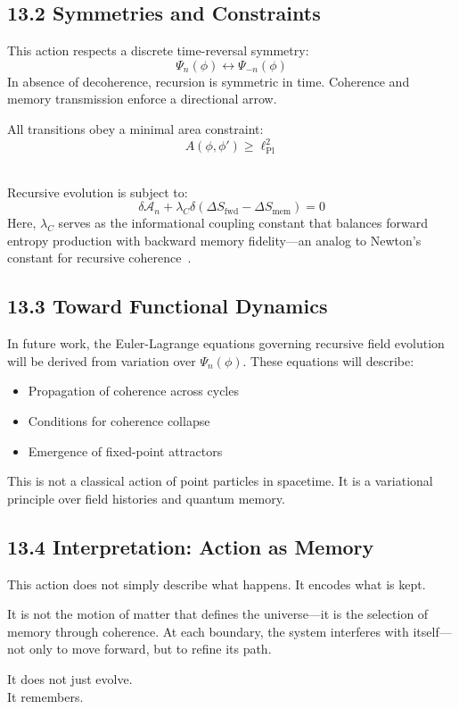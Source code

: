 \subsection*{13.2 Symmetries and Constraints}

This action respects a discrete time-reversal symmetry:
\[
\Psi_n(\phi) \leftrightarrow \Psi_{-n}(\phi)
\]
In absence of decoherence, recursion is symmetric in time. Coherence and memory transmission enforce a directional arrow.

All transitions obey a minimal area constraint:
\[
A(\phi, \phi') \geq \ell_{\text{Pl}}^2
\]
~\cite{bojowald2001absence, rovelli1995discreteness}

Recursive evolution is subject to:
\[
\delta \mathcal{A}_n + \lambda_C \delta(\Delta S_{\text{fwd}} - \Delta S_{\text{mem}}) = 0
\]
Here, \( \lambda_C \) serves as the informational coupling constant that balances forward entropy production with backward memory fidelity—an analog to Newton's constant for recursive coherence~\cite{gellmann1994complex}.

\subsection*{13.3 Toward Functional Dynamics}

In future work, the Euler-Lagrange equations governing recursive field evolution will be derived from variation over \( \Psi_n(\phi) \). These equations will describe:
\begin{itemize}
  \item Propagation of coherence across cycles
  \item Conditions for coherence collapse
  \item Emergence of fixed-point attractors~\cite{hartle1983wave, gellmann1994complex}
\end{itemize}

This is not a classical action of point particles in spacetime. It is a variational principle over field histories and quantum memory.

\subsection*{13.4 Interpretation: Action as Memory}

This action does not simply describe what happens. It encodes what is kept.

It is not the motion of matter that defines the universe---it is the selection of memory through coherence. At each boundary, the system interferes with itself---not only to move forward, but to refine its path.

It does not just evolve.\\
It remembers.

